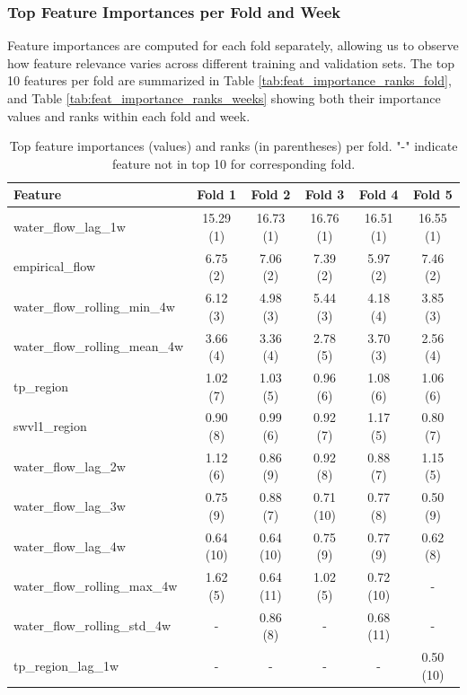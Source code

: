 \documentclass[a4paper,12pt]{article}
\begin{document}
\subsubsection{Top Feature Importances per Fold and Week}
Feature importances are computed for each fold separately, allowing us to observe how feature relevance varies 
across different training and validation sets. The top 10 features per fold are summarized in Table \ref{tab:feat_importance_ranks_fold}, 
and Table \ref{tab:feat_importance_ranks_weeks} showing both their importance values and ranks within each fold and week.
\begin{table}[ht]
\centering
\small
\begin{tabular}{lccccc}
\hline
\textbf{Feature} & \textbf{Fold 1} & \textbf{Fold 2} & \textbf{Fold 3} & \textbf{Fold 4} & \textbf{Fold 5} \\
\hline
water\_flow\_lag\_1w           & 15.29 (1) & 16.73 (1) & 16.76 (1) & 16.51 (1) & 16.55 (1) \\
empirical\_flow               & 6.75 (2)  & 7.06 (2)  & 7.39 (2)  & 5.97 (2)  & 7.46 (2) \\
water\_flow\_rolling\_min\_4w & 6.12 (3)  & 4.98 (3)  & 5.44 (3)  & 4.18 (4)  & 3.85 (3) \\
water\_flow\_rolling\_mean\_4w & 3.66 (4)  & 3.36 (4)  & 2.78 (5)  & 3.70 (3)  & 2.56 (4) \\
tp\_region                   & 1.02 (7)  & 1.03 (5)  & 0.96 (6)  & 1.08 (6)  & 1.06 (6) \\
swvl1\_region                & 0.90 (8)  & 0.99 (6)  & 0.92 (7)  & 1.17 (5)  & 0.80 (7) \\
water\_flow\_lag\_2w           & 1.12 (6)  & 0.86 (9)  & 0.92 (8)  & 0.88 (7)  & 1.15 (5) \\
water\_flow\_lag\_3w           & 0.75 (9)  & 0.88 (7)  & 0.71 (10) & 0.77 (8)  & 0.50 (9) \\
water\_flow\_lag\_4w           & 0.64 (10) & 0.64 (10) & 0.75 (9)  & 0.77 (9)  & 0.62 (8) \\
water\_flow\_rolling\_max\_4w & 1.62 (5)  & 0.64 (11) & 1.02 (5)  & 0.72 (10) & -         \\
water\_flow\_rolling\_std\_4w & -         & 0.86 (8)  & -         & 0.68 (11) & -         \\
tp\_region\_lag\_1w           & -         & -         & -         & -         & 0.50 (10) \\
\hline
\end{tabular}
\caption{Top feature importances (values) and ranks (in parentheses) per fold. "-" indicate feature not in top 10 for corresponding fold.}
\label{tab:feat_importance_ranks_folds}
\end{table}
\end{document}
